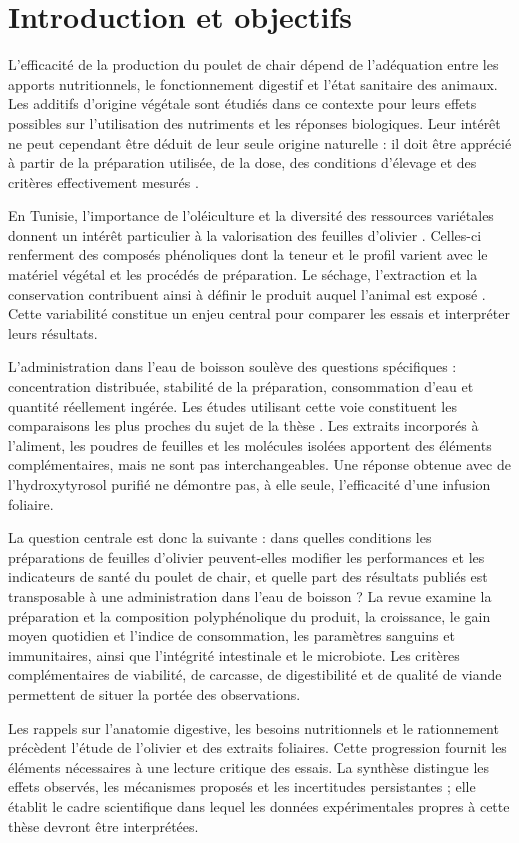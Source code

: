\section{Introduction et objectifs}

L'efficacité de la production du poulet de chair dépend de l'adéquation entre les apports nutritionnels, le fonctionnement digestif et l'état sanitaire des animaux. Les additifs d'origine végétale sont étudiés dans ce contexte pour leurs effets possibles sur l'utilisation des nutriments et les réponses biologiques. Leur intérêt ne peut cependant être déduit de leur seule origine naturelle : il doit être apprécié à partir de la préparation utilisée, de la dose, des conditions d'élevage et des critères effectivement mesurés \citep{RavindranAbdollahi2021,Gadde2017}.

En Tunisie, l'importance de l'oléiculture et la diversité des ressources variétales donnent un intérêt particulier à la valorisation des feuilles d'olivier \citep{Debbabi2022}. Celles-ci renferment des composés phénoliques dont la teneur et le profil varient avec le matériel végétal et les procédés de préparation. Le séchage, l'extraction et la conservation contribuent ainsi à définir le produit auquel l'animal est exposé \citep{Paskovic2025,CorAndrejc2022,Debs2023}. Cette variabilité constitue un enjeu central pour comparer les essais et interpréter leurs résultats.

L'administration dans l'eau de boisson soulève des questions spécifiques : concentration distribuée, stabilité de la préparation, consommation d'eau et quantité réellement ingérée. Les études utilisant cette voie constituent les comparaisons les plus proches du sujet de la thèse \citep{Jabri2017,Oke2017,Erener2023}. Les extraits incorporés à l'aliment, les poudres de feuilles et les molécules isolées apportent des éléments complémentaires, mais ne sont pas interchangeables. Une réponse obtenue avec de l'hydroxytyrosol purifié ne démontre pas, à elle seule, l'efficacité d'une infusion foliaire.

La question centrale est donc la suivante : dans quelles conditions les préparations de feuilles d'olivier peuvent-elles modifier les performances et les indicateurs de santé du poulet de chair, et quelle part des résultats publiés est transposable à une administration dans l'eau de boisson ? La revue examine la préparation et la composition polyphénolique du produit, la croissance, le gain moyen quotidien et l'indice de consommation, les paramètres sanguins et immunitaires, ainsi que l'intégrité intestinale et le microbiote. Les critères complémentaires de viabilité, de carcasse, de digestibilité et de qualité de viande permettent de situer la portée des observations.

Les rappels sur l'anatomie digestive, les besoins nutritionnels et le rationnement précèdent l'étude de l'olivier et des extraits foliaires. Cette progression fournit les éléments nécessaires à une lecture critique des essais. La synthèse distingue les effets observés, les mécanismes proposés et les incertitudes persistantes ; elle établit le cadre scientifique dans lequel les données expérimentales propres à cette thèse devront être interprétées.
